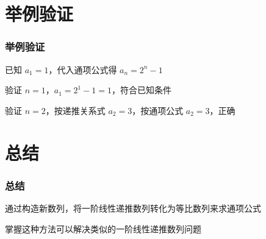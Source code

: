 \documentclass[aspectratio=169]{ctexbeamer} %
\begin{document}
\section{举例验证}
\begin{frame}
    \frametitle{举例验证}
    已知 \(a_{1}=1\)，代入通项公式得 \(a_{n}=2^{n} -1\)

    验证 \(n=1\)，\(a_{1}=2^{1} -1=1\)，符合已知条件

    验证 \(n=2\)，按递推关系式 \(a_{2}=3\)，按通项公式 \(a_{2}=3\)，正确
\end{frame}

\section{总结}
\begin{frame}
    \frametitle{总结}
    通过构造新数列，将一阶线性递推数列转化为等比数列来求通项公式

    掌握这种方法可以解决类似的一阶线性递推数列问题
\end{frame}
\end{document}
